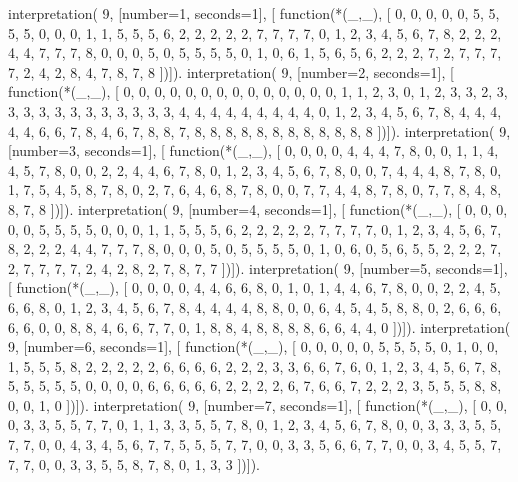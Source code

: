 interpretation( 9, [number=1, seconds=1], [
  function(*(_,_), [
     0, 0, 0, 0, 0, 5, 5, 5, 5,
     0, 0, 0, 1, 1, 5, 5, 5, 6,
     2, 2, 2, 2, 2, 7, 7, 7, 7,
     0, 1, 2, 3, 4, 5, 6, 7, 8,
     2, 2, 2, 4, 4, 7, 7, 7, 8,
     0, 0, 0, 5, 0, 5, 5, 5, 5,
     0, 1, 0, 6, 1, 5, 6, 5, 6,
     2, 2, 2, 7, 2, 7, 7, 7, 7,
     2, 4, 2, 8, 4, 7, 8, 7, 8 ])]).
interpretation( 9, [number=2, seconds=1], [
  function(*(_,_), [
     0, 0, 0, 0, 0, 0, 0, 0, 0,
     0, 0, 0, 0, 0, 1, 1, 2, 3,
     0, 1, 2, 3, 3, 2, 3, 3, 3,
     3, 3, 3, 3, 3, 3, 3, 3, 3,
     4, 4, 4, 4, 4, 4, 4, 4, 4,
     0, 1, 2, 3, 4, 5, 6, 7, 8,
     4, 4, 4, 4, 4, 6, 6, 7, 8,
     4, 6, 7, 8, 8, 7, 8, 8, 8,
     8, 8, 8, 8, 8, 8, 8, 8, 8 ])]).
interpretation( 9, [number=3, seconds=1], [
  function(*(_,_), [
     0, 0, 0, 0, 4, 4, 4, 7, 8,
     0, 0, 1, 1, 4, 4, 5, 7, 8,
     0, 0, 2, 2, 4, 4, 6, 7, 8,
     0, 1, 2, 3, 4, 5, 6, 7, 8,
     0, 0, 7, 4, 4, 4, 8, 7, 8,
     0, 1, 7, 5, 4, 5, 8, 7, 8,
     0, 2, 7, 6, 4, 6, 8, 7, 8,
     0, 0, 7, 7, 4, 4, 8, 7, 8,
     0, 7, 7, 8, 4, 8, 8, 7, 8 ])]).
interpretation( 9, [number=4, seconds=1], [
  function(*(_,_), [
     0, 0, 0, 0, 0, 5, 5, 5, 5,
     0, 0, 0, 1, 1, 5, 5, 5, 6,
     2, 2, 2, 2, 2, 7, 7, 7, 7,
     0, 1, 2, 3, 4, 5, 6, 7, 8,
     2, 2, 2, 4, 4, 7, 7, 7, 8,
     0, 0, 0, 5, 0, 5, 5, 5, 5,
     0, 1, 0, 6, 0, 5, 6, 5, 5,
     2, 2, 2, 7, 2, 7, 7, 7, 7,
     2, 4, 2, 8, 2, 7, 8, 7, 7 ])]).
interpretation( 9, [number=5, seconds=1], [
  function(*(_,_), [
     0, 0, 0, 0, 4, 4, 6, 6, 8,
     0, 1, 0, 1, 4, 4, 6, 7, 8,
     0, 0, 2, 2, 4, 5, 6, 6, 8,
     0, 1, 2, 3, 4, 5, 6, 7, 8,
     4, 4, 4, 4, 8, 8, 0, 0, 6,
     4, 5, 4, 5, 8, 8, 0, 2, 6,
     6, 6, 6, 6, 0, 0, 8, 8, 4,
     6, 6, 7, 7, 0, 1, 8, 8, 4,
     8, 8, 8, 8, 6, 6, 4, 4, 0 ])]).
interpretation( 9, [number=6, seconds=1], [
  function(*(_,_), [
     0, 0, 0, 0, 0, 5, 5, 5, 5,
     0, 1, 0, 0, 1, 5, 5, 5, 8,
     2, 2, 2, 2, 2, 6, 6, 6, 6,
     2, 2, 2, 3, 3, 6, 6, 7, 6,
     0, 1, 2, 3, 4, 5, 6, 7, 8,
     5, 5, 5, 5, 5, 0, 0, 0, 0,
     6, 6, 6, 6, 6, 2, 2, 2, 2,
     6, 7, 6, 6, 7, 2, 2, 2, 3,
     5, 5, 5, 8, 8, 0, 0, 1, 0 ])]).
interpretation( 9, [number=7, seconds=1], [
  function(*(_,_), [
     0, 0, 0, 3, 3, 5, 5, 7, 7,
     0, 1, 1, 3, 3, 5, 5, 7, 8,
     0, 1, 2, 3, 4, 5, 6, 7, 8,
     0, 0, 3, 3, 3, 5, 5, 7, 7,
     0, 0, 4, 3, 4, 5, 6, 7, 7,
     5, 5, 5, 7, 7, 0, 0, 3, 3,
     5, 6, 6, 7, 7, 0, 0, 3, 4,
     5, 5, 7, 7, 7, 0, 0, 3, 3,
     5, 5, 8, 7, 8, 0, 1, 3, 3 ])]).
